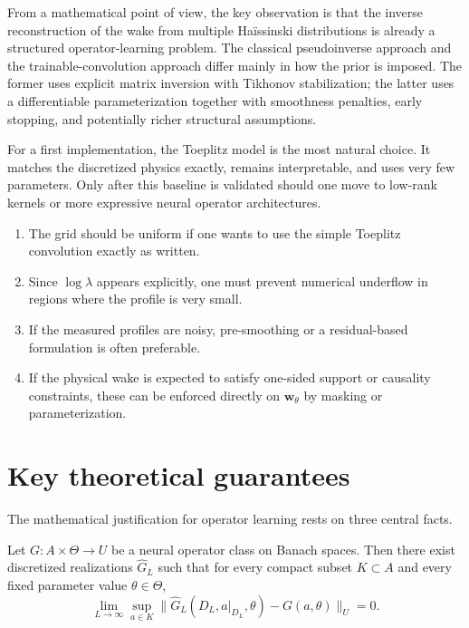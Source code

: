 \documentclass[11pt,a4paper]{article}
\begin{document}
\begin{sloppypar}
From a mathematical point of view, the key observation is that the inverse reconstruction of the wake from multiple Ha\"issinski distributions is already a structured operator-learning problem. The classical pseudoinverse approach and the trainable-convolution approach differ mainly in how the prior is imposed. The former uses explicit matrix inversion with Tikhonov stabilization; the latter uses a differentiable parameterization together with smoothness penalties, early stopping, and potentially richer structural assumptions.

For a first implementation, the Toeplitz model is the most natural choice. It matches the discretized physics exactly, remains interpretable, and uses very few parameters. Only after this baseline is validated should one move to low-rank kernels or more expressive neural operator architectures.


\begin{enumerate}
\item The grid should be uniform if one wants to use the simple Toeplitz convolution exactly as written.
\item Since $\log\lambda$ appears explicitly, one must prevent numerical underflow in regions where the profile is very small.
\item If the measured profiles are noisy, pre-smoothing or a residual-based formulation is often preferable.
\item If the physical wake is expected to satisfy one-sided support or causality constraints, these can be enforced directly on $\bm{w}_{\theta}$ by masking or parameterization.
\end{enumerate}


\section{Key theoretical guarantees}
\label{subsubsec:key-theorems}

The mathematical justification for operator learning rests on three central facts.

\begin{theorem}
Let $G : A \times \Theta \to U$ be a neural operator class on Banach spaces. Then there exist discretized realizations $\widehat{G}_L$ such that for every compact subset $K \subset A$ and every fixed parameter value $\theta \in \Theta$,
\begin{equation}
 \lim_{L\to\infty}
 \sup_{a\in K}
 \|\widehat{G}_L(D_L,a|_{D_L},\theta) - G(a,\theta)\|_U = 0.
 \label{eq:theorem-discretization-invariance}
\end{equation}
\end{theorem}


\end{sloppypar}
\end{document}

